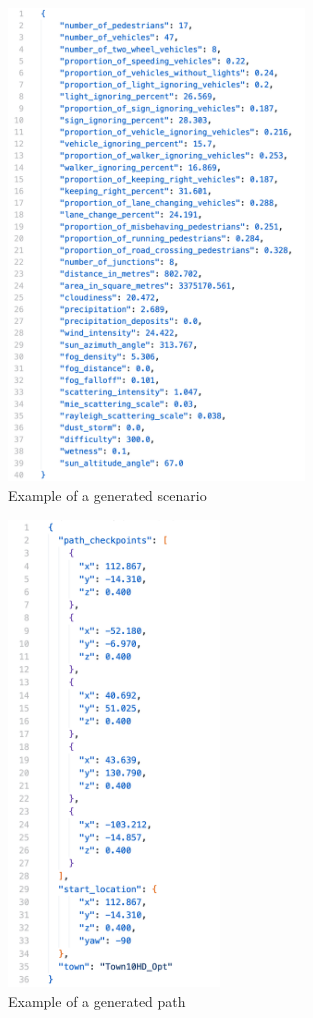 \begin{figure}
    \centering
    \includegraphics[width = 0.7\textwidth]{research_paper/Images/generated_scenario.png}
    \caption{Example of a generated scenario}
    \label{fig:generated_scenario}
\end{figure}

\begin{figure}
    \centering
    \includegraphics[width = 0.5\textwidth]{research_paper/Images/generated_path.png}
    \caption{Example of a generated path}
    \label{fig:generated_path}
\end{figure}

